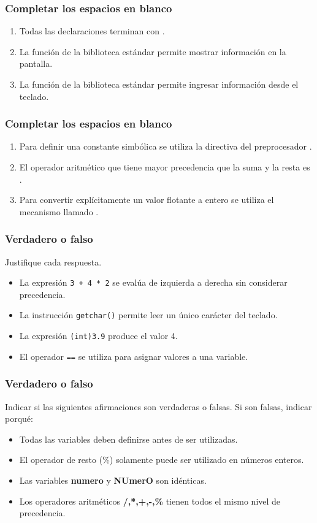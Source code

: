 \subsubsection{Completar los espacios en blanco}
\begin{enumerate}
  \item Todas las declaraciones terminan con \underspace.
  \item La función \underspace de la biblioteca estándar permite mostrar información en la pantalla.
  \item La función \underspace de la biblioteca estándar permite ingresar información desde el teclado.
\end{enumerate}
    
\subsubsection{Completar los espacios en blanco}
\begin{enumerate}
  \item Para definir una constante simbólica se utiliza la directiva del preprocesador \underspace.
  \item El operador aritmético que tiene mayor precedencia que la suma y la resta es \underspace.
  \item Para convertir explícitamente un valor flotante a entero se utiliza el mecanismo llamado \underspace.
\end{enumerate}
    
\subsubsection{Verdadero o falso}
Justifique cada respuesta.
\begin{itemize}
  \item La expresión \texttt{3 + 4 * 2} se evalúa de izquierda a derecha sin considerar precedencia.
  \item La instrucción \texttt{getchar()} permite leer un único carácter del teclado.
  \item La expresión \texttt{(int)3.9} produce el valor 4.
  \item El operador \texttt{==} se utiliza para asignar valores a una variable.
\end{itemize}


\subsubsection{Verdadero o falso}
Indicar si las siguientes afirmaciones son verdaderas o falsas. Si son falsas, indicar porqué:
\begin{itemize}
  \item Todas las variables deben definirse antes de ser utilizadas.
  \item El operador de resto (\%) solamente puede ser utilizado en números enteros.
  \item Las variables \textbf{numero} y \textbf{NUmerO} son idénticas.
  \item Los operadores aritméticos \textbf{/,*,+,-,\%} tienen todos el mismo nivel de precedencia.
\end{itemize}

